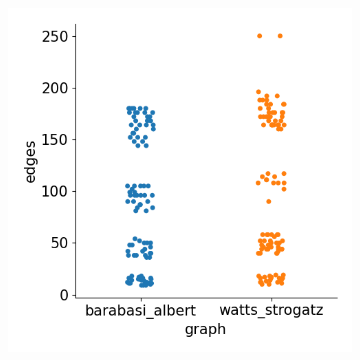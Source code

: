 \begin{figure}[H]
\begin{subfigure}{0.45\textwidth}
        \includegraphics[width=\linewidth]{images/results/random/relu/graph_edges.png}
        \caption{} \label{fig:relu_graph_edges}
    \end{subfigure}%
  

\end{figure}
